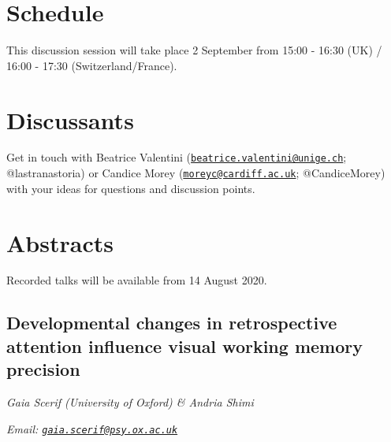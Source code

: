 \documentclass[
  12pt,
]{book}
\begin{document}
\hypertarget{schedule-3}{%
\section{Schedule}\label{schedule-3}}

This discussion session will take place 2 September from 15:00 - 16:30 (UK) / 16:00 - 17:30 (Switzerland/France).

\hypertarget{discussants-3}{%
\section{Discussants}\label{discussants-3}}

Get in touch with Beatrice Valentini (\href{mailto:beatrice.valentini@unige.ch}{\nolinkurl{beatrice.valentini@unige.ch}}; @lastranastoria) or Candice Morey (\href{mailto:moreyc@cardiff.ac.uk}{\nolinkurl{moreyc@cardiff.ac.uk}}; @CandiceMorey) with your ideas for questions and discussion points.

\hypertarget{abstracts-3}{%
\section{Abstracts}\label{abstracts-3}}

Recorded talks will be available from 14 August 2020.

\hypertarget{developmental-changes-in-retrospective-attention-influence-visual-working-memory-precision}{%
\subsection{Developmental changes in retrospective attention influence visual working memory precision}\label{developmental-changes-in-retrospective-attention-influence-visual-working-memory-precision}}

\emph{Gaia Scerif (University of Oxford) \& Andria Shimi}

\emph{Email: \href{mailto:gaia.scerif@psy.ox.ac.uk}{\nolinkurl{gaia.scerif@psy.ox.ac.uk}}}
\end{document}
